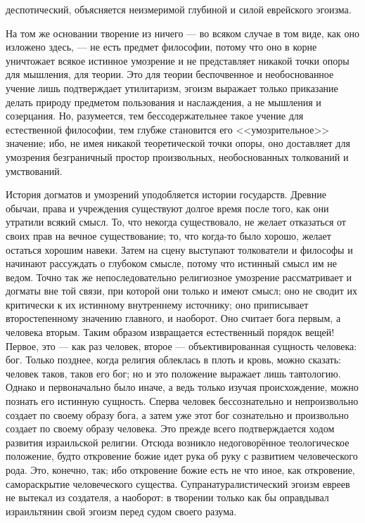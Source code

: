 \documentclass[12pt,oneside]{book}
\begin{document}
деспотический, объясняется неизмеримой глубиной и силой еврейского эгоизма.





На том же основании творение из ничего --- во всяком случае в том виде, как оно изложено здесь, --- не есть предмет философии, потому что оно в корне уничтожает всякое истинное умозрение и не представляет никакой точки опоры для мышления, для теории. Это для теории беспочвенное и необоснованное учение лишь подтверждает утилитаризм, эгоизм выражает только приказание делать природу предметом пользования и наслаждения, а не мышления и созерцания. Но, разумеется, тем бессодержательнее такое учение для естественной философии, тем глубже становится его <<умозрительное>> значение; ибо, не имея никакой теоретической точки опоры, оно доставляет для умозрения безграничный простор произвольных, необоснованных толкований и умствований.

История догматов и умозрений уподобляется истории государств. Древние обычаи, права и учреждения существуют долгое время после того, как они утратили всякий смысл. То, что некогда существовало, не желает отказаться от своих прав на вечное существование; то, что когда-то было хорошо, желает остаться хорошим навеки. Затем на сцену выступают толкователи и философы и начинают рассуждать о глубоком смысле, потому что истинный смысл им не ведом\ddag\let\svthefootnote\thefootnote\let\thefootnote\relax{}\let\thefootnote\svthefootnote. Точно так же непоследовательно религиозное умозрение рассматривает и догматы вне той связи, при которой они только и имеют смысл; оно не сводит их критически к их истинному внутреннему источнику; оно приписывает второстепенному значению главного, и наоборот. Оно считает бога первым, а человека вторым. Таким образом извращается естественный порядок вещей! Первое, это --- как раз человек, второе --- объективированная сущность человека: бог. Только позднее, когда религия облеклась в плоть и кровь, можно сказать: человек таков, таков его бог; но и это положение выражает лишь тавтологию. Однако и первоначально было иначе, а ведь только изучая происхождение, можно познать его истинную сущность. Сперва человек бессознательно и непроизвольно создает по своему образу бога, а затем уже этот бог сознательно и произвольно создает по своему образу человека. Это прежде всего подтверждается ходом развития израильской религии. Отсюда возникло недоговорённое теологическое положение, будто откровение божие идет рука об руку с развитием человеческого рода. Это, конечно, так; ибо откровение божие есть не что иное, как откровение, самораскрытие человеческого существа. Супранатуралистический эгоизм евреев не вытекал из создателя, а наоборот: в творении только как бы оправдывал израильтянин свой эгоизм перед судом своего разума.
\end{document}
